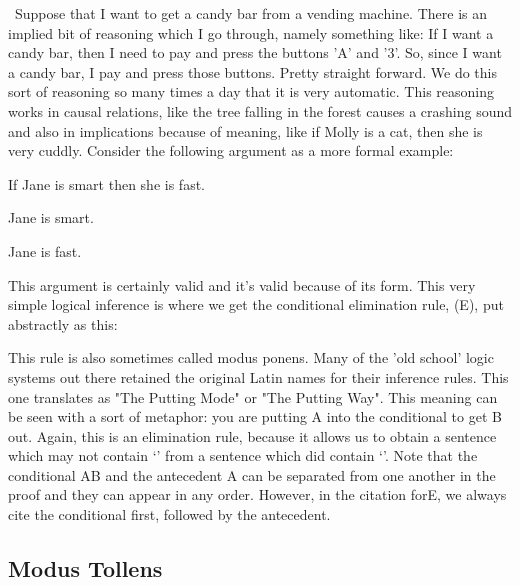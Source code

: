  Suppose that I want to get a candy bar from a vending machine. There is an implied bit of reasoning which I go through, namely something like: If I want a candy bar, then I need to pay and press the buttons 'A' and '3'. So, since I want a candy bar, I pay and press those buttons. Pretty straight forward. We do this sort of reasoning so many times a day that it is very automatic. This reasoning works in causal relations, like the tree falling in the forest causes a crashing sound and also in implications because of meaning, like if Molly is a cat, then she is very cuddly. Consider the following argument as a more formal example:
\begin{earg}
\item[] If Jane is smart then she is fast.
\item[] Jane is smart.
\item[\therefore] Jane is fast.
\end{earg}
This argument is certainly valid and it's valid because of its form. This very simple logical inference is where we get the conditional elimination rule, (\eif E), put abstractly as this:


This rule is also sometimes called modus ponens. Many of the 'old school' logic systems out there retained the original Latin names for their inference rules. This one translates as "The Putting Mode" or "The Putting Way". This meaning can be seen with a sort of metaphor: you are putting A into the conditional to get B out. Again, this is an elimination rule, because it allows us to obtain a sentence which may not contain ‘\eif ’ from a sentence which did contain ‘\eif ’. Note that the conditional A\eif B and the antecedent A can be separated from one another in the proof and they can appear in any order. However, in the citation for\eif E, we always cite the conditional first, followed by the antecedent.

\subsection{Modus Tollens}

